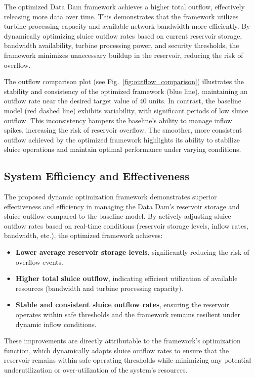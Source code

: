 The optimized Data Dam framework achieves a higher total outflow, effectively releasing more data over time. This demonstrates that the framework utilizes turbine processing capacity and available network bandwidth more efficiently. By dynamically optimizing sluice outflow rates based on current reservoir storage, bandwidth availability, turbine processing power, and security thresholds, the framework minimizes unnecessary buildup in the reservoir, reducing the risk of overflow.

The outflow comparison plot (see Fig.~\ref{fig:outflow_comparison}) illustrates the stability and consistency of the optimized framework (blue line), maintaining an outflow rate near the desired target value of 40 units. In contrast, the baseline model (red dashed line) exhibits variability, with significant periods of low sluice outflow. This inconsistency hampers the baseline's ability to manage inflow spikes, increasing the risk of reservoir overflow. The smoother, more consistent outflow achieved by the optimized framework highlights its ability to stabilize sluice operations and maintain optimal performance under varying conditions.

\subsection{System Efficiency and Effectiveness}
The proposed dynamic optimization framework demonstrates superior effectiveness and efficiency in managing the Data Dam's reservoir storage and sluice outflow compared to the baseline model. By actively adjusting sluice outflow rates based on real-time conditions (reservoir storage levels, inflow rates, bandwidth, etc.), the optimized framework achieves:
\begin{itemize}[itemsep=0pt, topsep=0pt]
    \item \textbf{Lower average reservoir storage levels}, significantly reducing the risk of overflow events.
    \item \textbf{Higher total sluice outflow}, indicating efficient utilization of available resources (bandwidth and turbine processing capacity).
    \item \textbf{Stable and consistent sluice outflow rates}, ensuring the reservoir operates within safe thresholds and the framework remains resilient under dynamic inflow conditions.
\end{itemize}
\vspace{5pt}
These improvements are directly attributable to the framework's optimization function, which dynamically adapts sluice outflow rates to ensure that the reservoir remains within safe operating thresholds while minimizing any potential underutilization or over-utilization of the system's resources.


